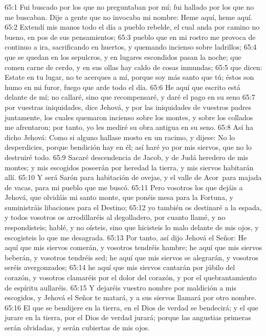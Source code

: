 65:1 Fui buscado por los que no preguntaban por mí; fui hallado por los que no me buscaban. Dije a gente que no invocaba mi nombre: Heme aquí, heme aquí. 
65:2 Extendí mis manos todo el día a pueblo rebelde, el cual anda por camino no bueno, en pos de sus pensamientos; 
65:3 pueblo que en mi rostro me provoca de continuo a ira, sacrificando en huertos, y quemando incienso sobre ladrillos; 
65:4 que se quedan en los sepulcros, y en lugares escondidos pasan la noche; que comen carne de cerdo, y en sus ollas hay caldo de cosas inmundas; 
65:5 que dicen: Estate en tu lugar, no te acerques a mí, porque soy más santo que tú; éstos son humo en mi furor, fuego que arde todo el día. 
65:6 He aquí que escrito está delante de mí; no callaré, sino que recompensaré, y daré el pago en su seno 
65:7 por vuestras iniquidades, dice Jehová, y por las iniquidades de vuestros padres juntamente, los cuales quemaron incienso sobre los montes, y sobre los collados me afrentaron; por tanto, yo les mediré su obra antigua en su seno. 
65:8 Así ha dicho Jehová: Como si alguno hallase mosto en un racimo, y dijese: No lo desperdicies, porque bendición hay en él; así haré yo por mis siervos, que no lo destruiré todo. 
65:9 Sacaré descendencia de Jacob, y de Judá heredero de mis montes; y mis escogidos poseerán por heredad la tierra, y mis siervos habitarán allí. 
65:10 Y será Sarón para habitación de ovejas, y el valle de Acor para majada de vacas, para mi pueblo que me buscó. 
65:11 Pero vosotros los que dejáis a Jehová, que olvidáis mi santo monte, que ponéis mesa para la Fortuna, y suministráis libaciones para el Destino; 
65:12 yo también os destinaré a la espada, y todos vosotros os arrodillaréis al degolladero, por cuanto llamé, y no respondisteis; hablé, y no oísteis, sino que hicisteis lo malo delante de mis ojos, y escogisteis lo que me desagrada. 
65:13 Por tanto, así dijo Jehová el Señor: He aquí que mis siervos comerán, y vosotros tendréis hambre; he aquí que mis siervos beberán, y vosotros tendréis sed; he aquí que mis siervos se alegrarán, y vosotros seréis avergonzados; 
65:14 he aquí que mis siervos cantarán por júbilo del corazón, y vosotros clamaréis por el dolor del corazón, y por el quebrantamiento de espíritu aullaréis. 
65:15 Y dejaréis vuestro nombre por maldición a mis escogidos, y Jehová el Señor te matará, y a sus siervos llamará por otro nombre. 
65:16 El que se bendijere en la tierra, en el Dios de verdad se bendecirá; y el que jurare en la tierra, por el Dios de verdad jurará; porque las angustias primeras serán olvidadas, y serán cubiertas de mis ojos. 
